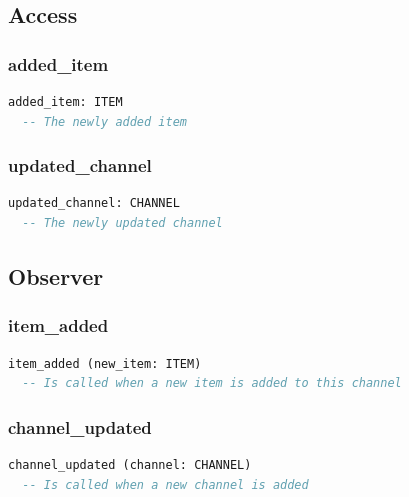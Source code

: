 \subsection{Access}
\label{sec:feed-simple-channel-observer-access}

\subsubsection{added\_item}

\begin{lstlisting}[language=Eiffel]
added_item: ITEM
  -- The newly added item
\end{lstlisting}

\subsubsection{updated\_channel}

\begin{lstlisting}[language=Eiffel]
updated_channel: CHANNEL
  -- The newly updated channel
\end{lstlisting}


\subsection{Observer}
\label{sec:feed-simple-channel-observer-observer}

\subsubsection{item\_added}

\begin{lstlisting}[language=Eiffel]
item_added (new_item: ITEM)
  -- Is called when a new item is added to this channel
\end{lstlisting}

\subsubsection{channel\_updated}

\begin{lstlisting}[language=Eiffel]
channel_updated (channel: CHANNEL)
  -- Is called when a new channel is added
\end{lstlisting}